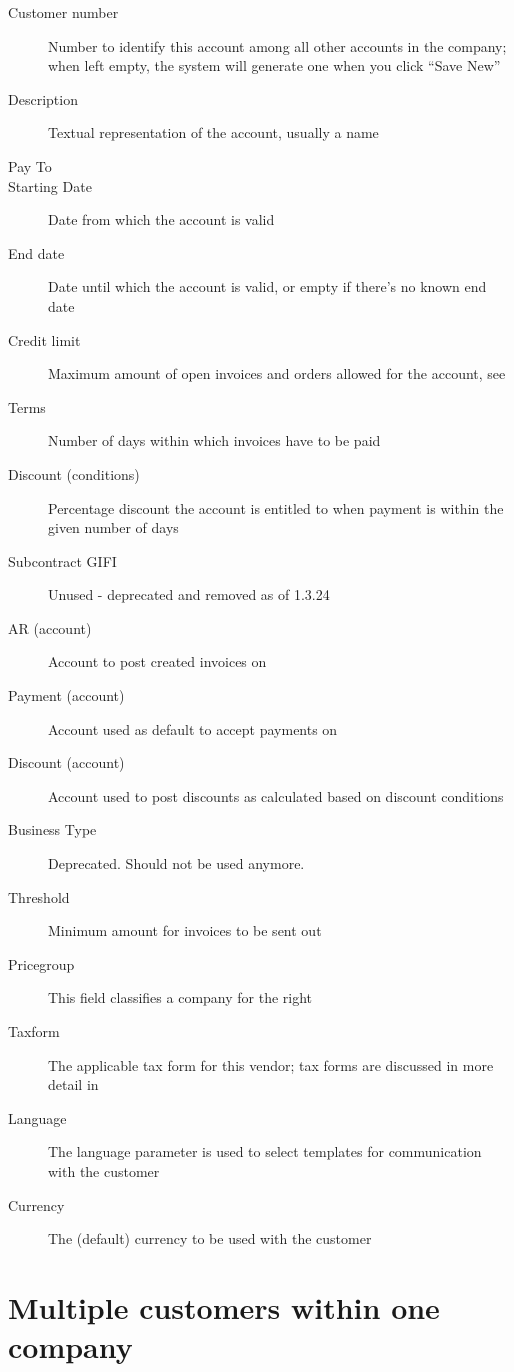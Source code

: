 \begin{description}
\item [Customer number] Number to identify this account among all other accounts in the company;
     when left empty, the system will generate one when you click ``Save New''
\item [Description] Textual representation of the account, usually a name
\item [Pay To] %
\item [Starting Date] Date from which the account is valid
\item [End date] Date until which the account is valid, or empty if there's no known end date
\item [Credit limit] Maximum amount of open invoices and orders allowed for the account, see
\item [Terms] Number of days within which invoices have to be paid
\item [Discount (conditions)] Percentage discount the account is entitled to when payment
         is within the given number of days
\item [Subcontract GIFI] Unused - deprecated and removed as of 1.3.24
\item [AR (account)] Account to post created invoices on
\item [Payment (account)] Account used as default to accept payments on
\item [Discount (account)] Account used to post discounts as calculated based on discount conditions
\item [Business Type] Deprecated. Should not be used anymore.
\item [Threshold] Minimum amount for invoices to be sent out
\item [Pricegroup] This field classifies a company for the right 
\item [Taxform] The applicable tax form for this vendor; tax forms are discussed in more detail in
\item [Language] The language parameter is used to select templates for communication with the customer
\item [Currency] The (default) currency to be used with the customer
\end{description}

\section{Multiple customers within one company}

